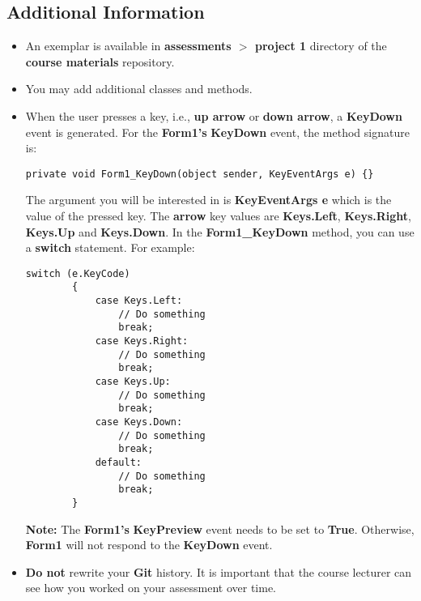 \documentclass{article}
\begin{document}
\subsection*{Additional Information}
\begin{itemize}
    \item An exemplar is available in \textbf{assessments $>$ project 1} directory of the \textbf{course materials} repository.
    \item You may add additional classes and methods.
    \item When the user presses a key, i.e., \textbf{up arrow} or \textbf{down arrow}, a \textbf{KeyDown} event is generated. For the \textbf{Form1's} \textbf{KeyDown} event, the method signature is:
    \begin{Verbatim}[tabsize=2]
		private void Form1_KeyDown(object sender, KeyEventArgs e) {}
	\end{Verbatim}
	The argument you will be interested in is \textbf{KeyEventArgs e} which is the value of the pressed key. The \textbf{arrow} key values are \textbf{Keys.Left}, \textbf{Keys.Right}, \textbf{Keys.Up} and \textbf{Keys.Down}. In the \textbf{Form1\_KeyDown} method, you can use a \textbf{switch} statement. For example:
	\begin{Verbatim}[tabsize=2]
		switch (e.KeyCode) 
		{
			case Keys.Left:
				// Do something
				break;
			case Keys.Right:
				// Do something
				break;
			case Keys.Up:
				// Do something
				break;
			case Keys.Down:
				// Do something
				break;
			default:
				// Do something
				break;
		}
	\end{Verbatim}
	\textbf{Note:} The \textbf{Form1's} \textbf{KeyPreview} event needs to be set to \textbf{True}. Otherwise, \textbf{Form1} will not respond to the \textbf{KeyDown} event.
    \item \textbf{Do not} rewrite your \textbf{Git} history. It is important that the course lecturer can see how you worked on your assessment over time.
\end{itemize}
\end{document}
